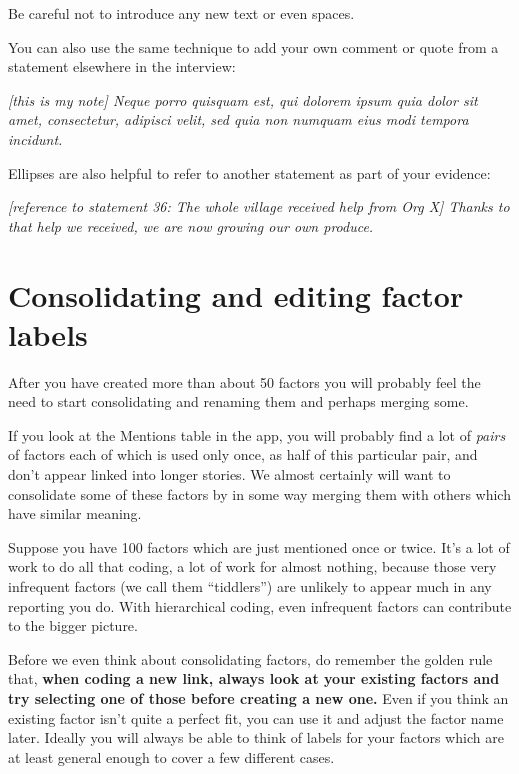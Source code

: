 \documentclass[
]{book}
\begin{document}
Be careful not to introduce any new text or even spaces.

You can also use the same technique to add your own comment or quote from a statement elsewhere in the interview:

\emph{{[}this is my note{]} Neque porro quisquam est, qui dolorem ipsum quia dolor sit amet, consectetur, adipisci velit, sed quia non numquam eius modi tempora incidunt.}

Ellipses are also helpful to refer to another statement as part of your evidence:

\emph{{[}reference to statement 36: The whole village received help from Org X{]} Thanks to that help we received, we are now growing our own produce.}

\hypertarget{consolidating-and-editing-factor-labels}{%
\section{Consolidating and editing factor labels}\label{consolidating-and-editing-factor-labels}}

After you have created more than about 50 factors you will probably feel the need to start consolidating and renaming them and perhaps merging some.

If you look at the Mentions table in the app, you will probably find a lot of \emph{pairs} of factors each of which is used only once, as half of this particular pair, and don't appear linked into longer stories. We almost certainly will want to consolidate some of these factors by in some way merging them with others which have similar meaning.

Suppose you have 100 factors which are just mentioned once or twice. It's a lot of work to do all that coding, a lot of work for almost nothing, because those very infrequent factors (we call them ``tiddlers'') are unlikely to appear much in any reporting you do. With hierarchical coding, even infrequent factors can contribute to the bigger picture.

Before we even think about consolidating factors, do remember the golden rule that, \textbf{when coding a new link, always look at your existing factors and try selecting one of those before creating a new one.} Even if you think an existing factor isn't quite a perfect fit, you can use it and adjust the factor name later. Ideally you will always be able to think of labels for your factors which are at least general enough to cover a few different cases.
\end{document}
